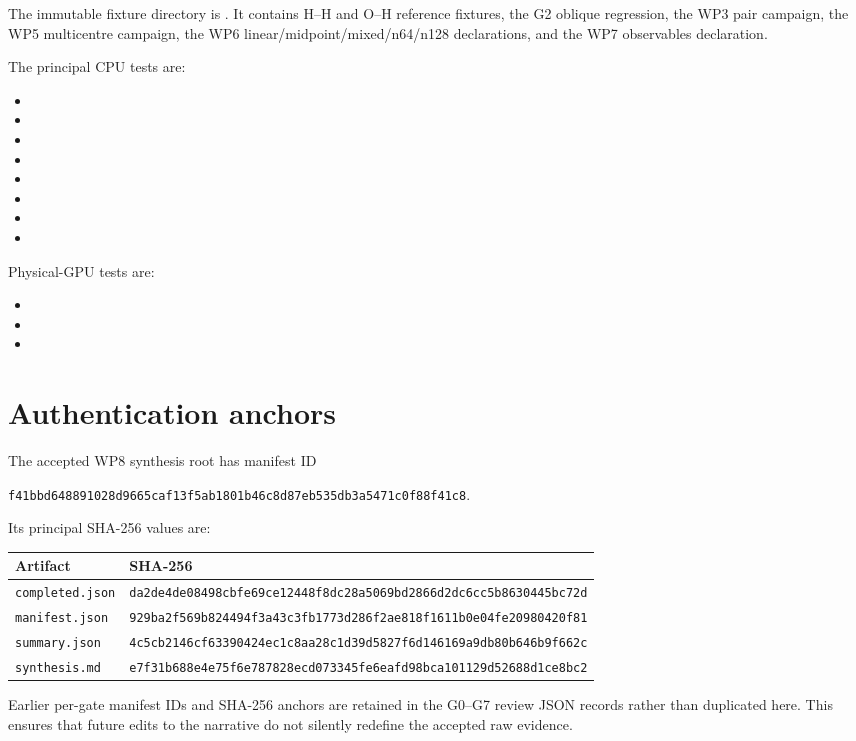 \documentclass[11pt]{article}
\begin{document}
The immutable fixture directory is
.  It contains H--H and O--H reference
fixtures, the G2 oblique regression, the WP3 pair campaign, the WP5
multicentre campaign, the WP6 linear/midpoint/mixed/n64/n128 declarations,
and the WP7 observables declaration.

The principal CPU tests are:
\begin{itemize}
  \item {}
  \item {}
  \item {}
  \item {}
  \item {}
  \item {}
  \item {}
  \item {}
\end{itemize}
Physical-GPU tests are:
\begin{itemize}
  \item {}
  \item {}
  \item {}
\end{itemize}

\section{Authentication anchors}

The accepted WP8 synthesis root has manifest ID
\begin{center}
\texttt{f41bbd648891028d9665caf13f5ab1801b46c8d87eb535db3a5471c0f88f41c8}.
\end{center}
Its principal SHA-256 values are:

\begin{center}\scriptsize
\begin{tabular}{ll}
\toprule
Artifact & SHA-256 \\
\midrule
\texttt{completed.json} & \texttt{da2de4de08498cbfe69ce12448f8dc28a5069bd2866d2dc6cc5b8630445bc72d} \\
\texttt{manifest.json} & \texttt{929ba2f569b824494f3a43c3fb1773d286f2ae818f1611b0e04fe20980420f81} \\
\texttt{summary.json} & \texttt{4c5cb2146cf63390424ec1c8aa28c1d39d5827f6d146169a9db80b646b9f662c} \\
\texttt{synthesis.md} & \texttt{e7f31b688e4e75f6e787828ecd073345fe6eafd98bca101129d52688d1ce8bc2} \\
\bottomrule
\end{tabular}
\end{center}

Earlier per-gate manifest IDs and SHA-256 anchors are retained in the G0--G7
review JSON records rather than duplicated here.  This ensures that future
edits to the narrative do not silently redefine the accepted raw evidence.
\end{document}
